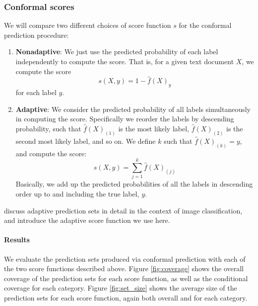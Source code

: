 \documentclass[a4paper, 12pt]{article}
\begin{document}
\subsubsection*{Conformal scores}
We will compare two different choices of score function $s$ for the conformal prediction procedure:
\begin{enumerate}
    \item \textbf{Nonadaptive}: We just use the predicted probability of each label independently to compute the score. That is, for a given text document $X$, we compute the score \[s(X, y) = 1 - \hat{f}(X)_y \] for each label $y$.
    \item \textbf{Adaptive}: We consider the predicted probability of all labels simultaneously in computing the score. Specifically we reorder the labels by descending probability, such that $\hat{f}(X)_{(1)}$ is the most likely label, $\hat{f}(X)_{(2)}$ is the second most likely label, and so on. We define $k$ such that $\hat{f}(X)_{(k)} = y$, and compute the score: \[ s(X, y) = \sum_{j=1}^{k} \hat{f}(X)_{(j)} \] Basically, we add up the predicted probabilities of all the labels in descending order up to and including the true label, $y$.
\end{enumerate}

\textcite{angelopoulosUncertaintySetsImage2022} discuss adaptive prediction sets in detail in the context of image classification, and introduce the adaptive score function we use here.

\paragraph*{Results} We evaluate the prediction sets produced via conformal prediction with each of the two score functions described above. Figure \ref{fig:coverage} shows the overall coverage of the prediction sets for each score function, as well as the conditional coverage for each category. Figure \ref{fig:set_size} shows the average size of the prediction sets for each score function, again both overall and for each category.
\end{document}
